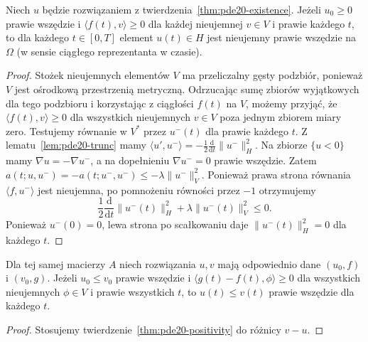 \begin{twierdzenie}\label{thm:pde20-positivity}
Niech $u$ będzie rozwiązaniem z twierdzenia~\ref{thm:pde20-existence}.
Jeżeli $u_0\ge0$ prawie wszędzie i $\langle f(t),v\rangle\ge0$
dla każdej nieujemnej $v\in V$ i prawie każdego $t$, to
dla każdego $t\in[0,T]$ element $u(t)\in H$
jest nieujemny prawie wszędzie na $\Omega$
(w sensie ciągłego reprezentanta w czasie).
\end{twierdzenie}
\begin{proof}
Stożek nieujemnych elementów $V$ ma przeliczalny
gęsty podzbiór, ponieważ $V$ jest ośrodkową
przestrzenią metryczną. Odrzucając sumę zbiorów
wyjątkowych dla tego podzbioru i korzystając
z ciągłości $f(t)$ na $V$, możemy przyjąć, że
$\langle f(t),v\rangle\ge0$ dla wszystkich
nieujemnych $v\in V$ poza jednym zbiorem miary zero.
Testujemy równanie w $V^*$ przez $u^-(t)$
dla prawie każdego $t$. Z lematu~\ref{lem:pde20-trunc} mamy
$\langle u',u^-\rangle=-\frac12\frac{\mathrm d}{\mathrm dt}\|u^-\|_H^2$.
Na zbiorze $\{u<0\}$ mamy $\nabla u=-\nabla u^-$,
a na dopełnieniu $\nabla u^-=0$ prawie wszędzie. Zatem
$a(t;u,u^-)=-a(t;u^-,u^-)\le-\lambda\|u^-\|_V^2$.
Ponieważ prawa strona równania
$\langle f,u^-\rangle$ jest nieujemna, po pomnożeniu
równości przez $-1$ otrzymujemy
\[
 \frac12\frac{\mathrm d}{\mathrm dt}\|u^-(t)\|_H^2
 +\lambda\|u^-(t)\|_V^2\le0.
\]
Ponieważ $u^-(0)=0$, lewa strona po scałkowaniu daje
$\|u^-(t)\|_H^2=0$ dla każdego $t$.
\end{proof}

\begin{wniosek}
Dla tej samej macierzy $A$ niech rozwiązania $u,v$ mają
odpowiednio dane $(u_0,f)$ i $(v_0,g)$.
Jeżeli $u_0\le v_0$ prawie wszędzie i
$\langle g(t)-f(t),\phi\rangle\ge0$ dla wszystkich
nieujemnych $\phi\in V$ i prawie wszystkich $t$,
to $u(t)\le v(t)$ prawie wszędzie dla każdego $t$.
\end{wniosek}
\begin{proof}
Stosujemy twierdzenie~\ref{thm:pde20-positivity}
do różnicy $v-u$.
\end{proof}

